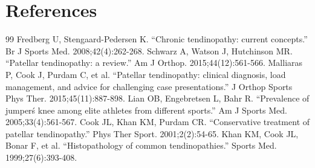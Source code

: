 \section*{References}
\begin{thebibliography}{99}
 Fredberg U, Stengaard-Pedersen K. ``Chronic tendinopathy: current concepts.'' Br J Sports Med. 2008;42(4):262-268.
 Schwarz A, Watson J, Hutchinson MR. ``Patellar tendinopathy: a review.'' Am J Orthop. 2015;44(12):561-566.
 Malliaras P, Cook J, Purdam C, et al. ``Patellar tendinopathy: clinical diagnosis, load management, and advice for challenging case presentations.'' J Orthop Sports Phys Ther. 2015;45(11):887-898.
 Lian OB, Engebretsen L, Bahr R. ``Prevalence of jumper\'s knee among elite athletes from different sports.'' Am J Sports Med. 2005;33(4):561-567.
 Cook JL, Khan KM, Purdam CR. ``Conservative treatment of patellar tendinopathy.'' Phys Ther Sport. 2001;2(2):54-65.
 Khan KM, Cook JL, Bonar F, et al. ``Histopathology of common tendinopathies.'' Sports Med. 1999;27(6):393-408.
\end{thebibliography}

